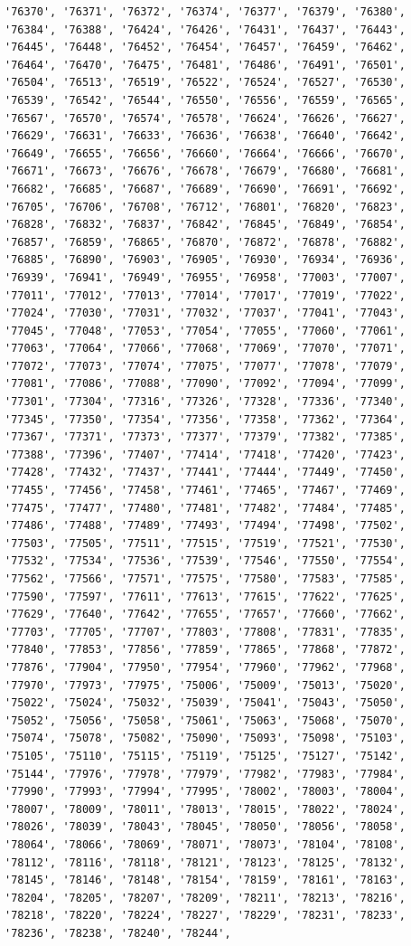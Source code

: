 \documentclass[
  letterpaper,
  DIV=11,
  numbers=noendperiod]{scrartcl}
\begin{document}
\begin{verbatim}
'76370', '76371', '76372', '76374', '76377', '76379', '76380', '76384', '76388', '76424', '76426', '76431', '76437', '76443', '76445', '76448', '76452', '76454', '76457', '76459', '76462', '76464', '76470', '76475', '76481', '76486', '76491', '76501', '76504', '76513', '76519', '76522', '76524', '76527', '76530', '76539', '76542', '76544', '76550', '76556', '76559', '76565', '76567', '76570', '76574', '76578', '76624', '76626', '76627', '76629', '76631', '76633', '76636', '76638', '76640', '76642', '76649', '76655', '76656', '76660', '76664', '76666', '76670', '76671', '76673', '76676', '76678', '76679', '76680', '76681', '76682', '76685', '76687', '76689', '76690', '76691', '76692', '76705', '76706', '76708', '76712', '76801', '76820', '76823', '76828', '76832', '76837', '76842', '76845', '76849', '76854', '76857', '76859', '76865', '76870', '76872', '76878', '76882', '76885', '76890', '76903', '76905', '76930', '76934', '76936', '76939', '76941', '76949', '76955', '76958', '77003', '77007', '77011', '77012', '77013', '77014', '77017', '77019', '77022', '77024', '77030', '77031', '77032', '77037', '77041', '77043', '77045', '77048', '77053', '77054', '77055', '77060', '77061', '77063', '77064', '77066', '77068', '77069', '77070', '77071', '77072', '77073', '77074', '77075', '77077', '77078', '77079', '77081', '77086', '77088', '77090', '77092', '77094', '77099', '77301', '77304', '77316', '77326', '77328', '77336', '77340', '77345', '77350', '77354', '77356', '77358', '77362', '77364', '77367', '77371', '77373', '77377', '77379', '77382', '77385', '77388', '77396', '77407', '77414', '77418', '77420', '77423', '77428', '77432', '77437', '77441', '77444', '77449', '77450', '77455', '77456', '77458', '77461', '77465', '77467', '77469', '77475', '77477', '77480', '77481', '77482', '77484', '77485', '77486', '77488', '77489', '77493', '77494', '77498', '77502', '77503', '77505', '77511', '77515', '77519', '77521', '77530', '77532', '77534', '77536', '77539', '77546', '77550', '77554', '77562', '77566', '77571', '77575', '77580', '77583', '77585', '77590', '77597', '77611', '77613', '77615', '77622', '77625', '77629', '77640', '77642', '77655', '77657', '77660', '77662', '77703', '77705', '77707', '77803', '77808', '77831', '77835', '77840', '77853', '77856', '77859', '77865', '77868', '77872', '77876', '77904', '77950', '77954', '77960', '77962', '77968', '77970', '77973', '77975', '75006', '75009', '75013', '75020', '75022', '75024', '75032', '75039', '75041', '75043', '75050', '75052', '75056', '75058', '75061', '75063', '75068', '75070', '75074', '75078', '75082', '75090', '75093', '75098', '75103', '75105', '75110', '75115', '75119', '75125', '75127', '75142', '75144', '77976', '77978', '77979', '77982', '77983', '77984', '77990', '77993', '77994', '77995', '78002', '78003', '78004', '78007', '78009', '78011', '78013', '78015', '78022', '78024', '78026', '78039', '78043', '78045', '78050', '78056', '78058', '78064', '78066', '78069', '78071', '78073', '78104', '78108', '78112', '78116', '78118', '78121', '78123', '78125', '78132', '78145', '78146', '78148', '78154', '78159', '78161', '78163', '78204', '78205', '78207', '78209', '78211', '78213', '78216', '78218', '78220', '78224', '78227', '78229', '78231', '78233', '78236', '78238', '78240', '78244', 
\end{verbatim}
\end{document}
